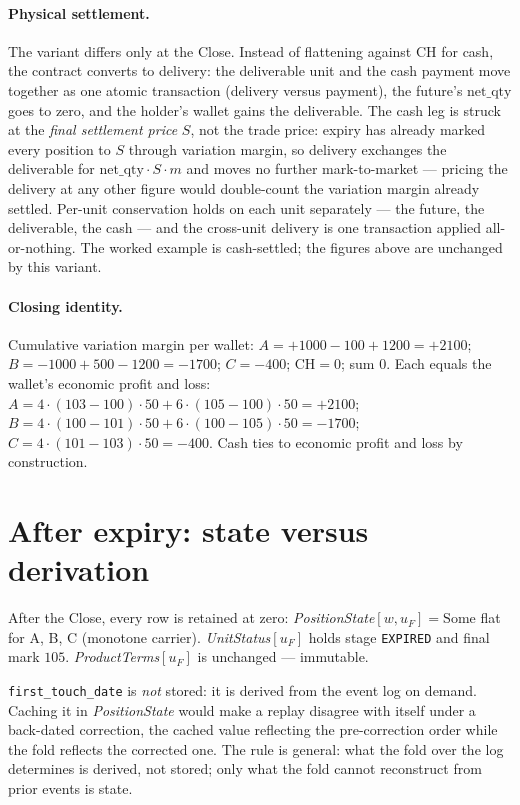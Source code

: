 \documentclass[11pt]{article}
\newcommand{\netq}{\mathrm{net\_qty}}
\newcommand{\code}[1]{\texttt{#1}}
\newcommand{\unit}{u_{F}}
\newcommand{\mult}{m}
\begin{document}
\paragraph{Physical settlement.} The variant differs only at the Close. Instead of flattening
against CH for cash, the contract converts to delivery: the deliverable unit and the cash payment
move together as one atomic transaction (delivery versus payment), the future's $\netq$ goes to
zero, and the holder's wallet gains the deliverable. The cash leg is struck at the \emph{final
settlement price} $S$, not the trade price: expiry has already marked every position to $S$ through
variation margin, so delivery exchanges the deliverable for $\netq\cdot S\cdot\mult$ and moves no
further mark-to-market --- pricing the delivery at any other figure would double-count the variation
margin already settled. Per-unit conservation holds on each unit separately --- the future, the
deliverable, the cash --- and the cross-unit delivery is one transaction applied all-or-nothing. The
worked example is cash-settled; the figures above are unchanged by this variant.

\paragraph{Closing identity.} Cumulative variation margin per wallet:
$A = +1000-100+1200 = +2100$; $B = -1000+500-1200 = -1700$; $C = -400$; $\text{CH}=0$; sum $0$. Each
equals the wallet's economic profit and loss:
$A = 4\cdot(103-100)\cdot 50 + 6\cdot(105-100)\cdot 50 = +2100$;
$B = 4\cdot(100-101)\cdot 50 + 6\cdot(100-105)\cdot 50 = -1700$;
$C = 4\cdot(101-103)\cdot 50 = -400$. Cash ties to economic profit and loss by construction.

\section{After expiry: state versus derivation}

After the Close, every row is retained at zero: \emph{PositionState}$[w,\unit]=\mathrm{Some}$ flat
for A, B, C (monotone carrier). \emph{UnitStatus}$[\unit]$ holds stage \code{EXPIRED} and final mark
$105$. \emph{ProductTerms}$[\unit]$ is unchanged --- immutable.

\code{first\_touch\_date} is \emph{not} stored: it is derived from the event log on demand. Caching
it in \emph{PositionState} would make a replay disagree with itself under a back-dated correction,
the cached value reflecting the pre-correction order while the fold reflects the corrected one. The
rule is general: what the fold over the log determines is derived, not stored; only what the fold
cannot reconstruct from prior events is state.
\end{document}
